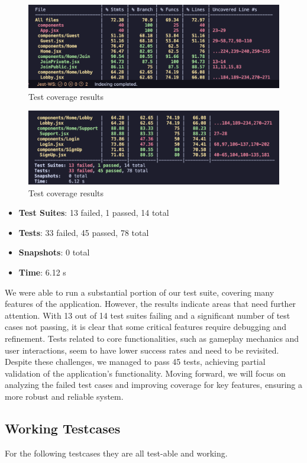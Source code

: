 \begin{figure}[H]
    \centering
    \includegraphics[width=0.8\linewidth]{branch1.png}
    \caption{Test coverage results}
    \label{fig:branch1}
\end{figure}

\begin{figure}[H]
    \centering
    \includegraphics[width=0.8\linewidth]{branch2.png}
    \caption{Test coverage results}
    \label{fig:branch2}
\end{figure}

\begin{itemize}
    \item \textbf{Test Suites}: 13 failed, 1 passed, 14 total
    \item \textbf{Tests}: 33 failed, 45 passed, 78 total
    \item \textbf{Snapshots}: 0 total
    \item \textbf{Time}: 6.12 s
\end{itemize}

\noindent We were able to run a substantial portion of our test suite, covering many features of the application. However, the results indicate areas that need further attention. With 13 out of 14 test suites failing and a significant number of test cases not passing, it is clear that some critical features require debugging and refinement. Tests related to core functionalities, such as gameplay mechanics and user interactions, seem to have lower success rates and need to be revisited. Despite these challenges, we managed to pass 45 tests, achieving partial validation of the application’s functionality. Moving forward, we will focus on analyzing the failed test cases and improving coverage for key features, ensuring a more robust and reliable system.


\subsection{Working Testcases}
For the following testcases they are all test-able and working.

